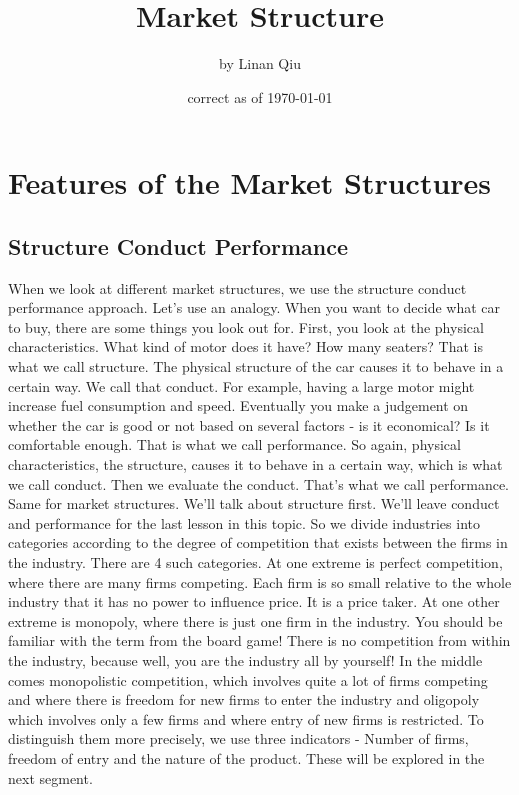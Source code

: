 \RequirePackage{../../dominatrix}

\title{Market Structure}
\author{\large by Linan Qiu}
\date{\small correct as of \today}

\maketitle
\tableofcontents
\section{Features of the Market Structures}
\subsection{Structure Conduct Performance}
When we look at different market structures, we use the structure conduct performance approach. Let’s use an analogy. When you want to decide what car to buy, there are some things you look out for. First, you look at the physical characteristics. What kind of motor does it have? How many seaters? That is what we call structure. The physical structure of the car causes it to behave in a certain way. We call that conduct. For example, having a large motor might increase fuel consumption and speed. Eventually you make a judgement on whether the car is good or not based on several factors - is it economical? Is it comfortable enough. That is what we call performance. So again, physical characteristics, the structure, causes it to behave in a certain way, which is what we call conduct. Then we evaluate the conduct. That’s what we call performance. Same for market structures. We’ll talk about structure first. We’ll leave conduct and performance for the last lesson in this topic. So we divide industries into categories according to the degree of competition that exists between the firms in the industry. There are 4 such categories. At one extreme is perfect competition, where there are many firms competing. Each firm is so small relative to the whole industry that it has no power to influence price. It is a price taker. At one other extreme is monopoly, where there is just one firm in the industry. You should be familiar with the term from the board game! There is no competition from within the industry, because well, you are the industry all by yourself! In the middle comes monopolistic competition, which involves quite a lot of firms competing and where there is freedom for new firms to enter the industry and oligopoly which involves only a few firms and where entry of new firms is restricted. To distinguish them more precisely, we use three indicators - Number of firms, freedom of entry and the nature of the product. These will be explored in the next segment.
